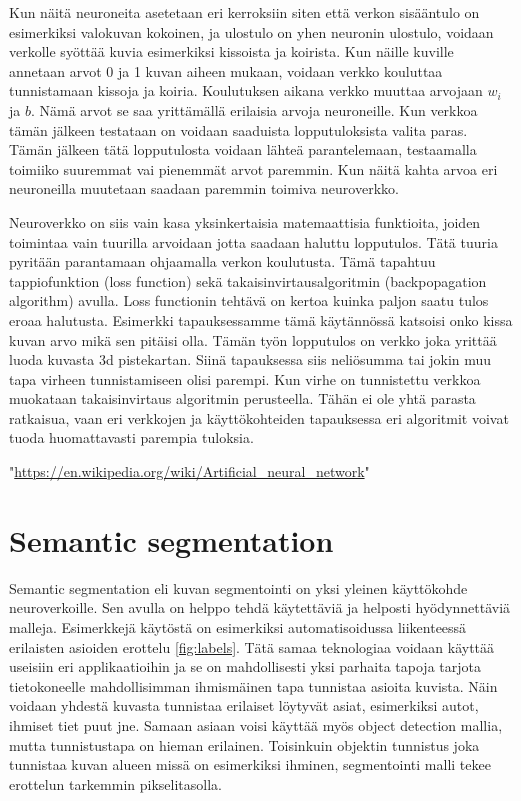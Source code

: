Kun näitä neuroneita asetetaan eri kerroksiin siten että verkon sisääntulo on esimerkiksi valokuvan kokoinen, ja ulostulo on yhen neuronin ulostulo, voidaan verkolle syöttää kuvia esimerkiksi kissoista ja koirista. Kun näille kuville annetaan arvot 0 ja 1 kuvan aiheen mukaan, voidaan verkko kouluttaa tunnistamaan kissoja ja koiria. Koulutuksen aikana verkko muuttaa arvojaan \(w_i\) ja \(b\). Nämä arvot se saa yrittämällä erilaisia arvoja neuroneille. Kun verkkoa tämän jälkeen testataan on voidaan saaduista lopputuloksista valita paras. Tämän jälkeen tätä lopputulosta voidaan lähteä parantelemaan, testaamalla toimiiko suuremmat vai pienemmät arvot paremmin. Kun näitä kahta arvoa eri neuroneilla muutetaan saadaan paremmin toimiva neuroverkko.

Neuroverkko on siis vain kasa yksinkertaisia matemaattisia funktioita, joiden toimintaa vain tuurilla arvoidaan jotta saadaan haluttu lopputulos. Tätä tuuria pyritään parantamaan ohjaamalla verkon koulutusta. Tämä tapahtuu tappiofunktion (loss function) sekä takaisinvirtausalgoritmin (backpopagation algorithm) avulla. Loss functionin tehtävä on kertoa kuinka paljon saatu tulos eroaa halutusta. Esimerkki tapauksessamme tämä käytännössä katsoisi onko kissa kuvan arvo mikä sen pitäisi olla. Tämän työn lopputulos on verkko joka yrittää luoda kuvasta 3d pistekartan. Siinä tapauksessa siis neliösumma tai jokin muu tapa virheen tunnistamiseen olisi parempi. Kun virhe on tunnistettu verkkoa muokataan takaisinvirtaus algoritmin perusteella. Tähän ei ole yhtä parasta ratkaisua, vaan eri verkkojen ja käyttökohteiden tapauksessa eri algoritmit voivat tuoda huomattavasti parempia tuloksia.

"\url{https://en.wikipedia.org/wiki/Artificial_neural_network}"

\section{Semantic segmentation}

Semantic segmentation eli kuvan segmentointi on yksi yleinen käyttökohde neuroverkoille. Sen avulla on helppo tehdä käytettäviä ja helposti hyödynnettäviä malleja. Esimerkkejä käytöstä on esimerkiksi automatisoidussa liikenteessä erilaisten asioiden erottelu \ref{fig:labels}. Tätä samaa teknologiaa voidaan käyttää useisiin eri applikaatioihin ja se on mahdollisesti yksi parhaita tapoja tarjota tietokoneelle mahdollisimman ihmismäinen tapa tunnistaa asioita kuvista. Näin voidaan yhdestä kuvasta tunnistaa erilaiset löytyvät asiat, esimerkiksi autot, ihmiset tiet puut jne. Samaan asiaan voisi käyttää myös object detection mallia, mutta tunnistustapa on hieman erilainen. Toisinkuin objektin tunnistus joka tunnistaa kuvan alueen missä on esimerkiksi ihminen, segmentointi malli tekee erottelun tarkemmin pikselitasolla.

